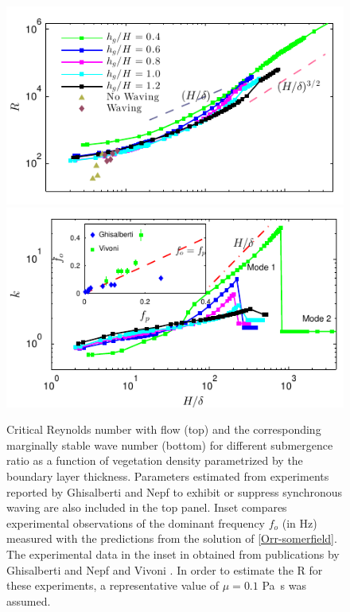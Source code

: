 \documentclass[aps,prl,twocolumn,superscriptaddress,10pt]{revtex4-1}  %
\newcommand{\Rey}{\text{R}}
\begin{document}
\begin{figure}
\begin{center}
\includegraphics[]{Critical_Re_vs_delta_noshear} \\
\vspace{-6mm} \hspace{-3mm}
\includegraphics[]{K_vs_shear_width_noshear}
\end{center}
\caption{Critical Reynolds number with flow (top) and the corresponding marginally stable wave number (bottom) for different submergence ratio as a function of vegetation density
 parametrized by the boundary layer thickness. Parameters estimated from experiments reported by Ghisalberti and Nepf\cite{Ghisal02} to exhibit or suppress synchronous waving are 
also included in the top panel. Inset compares experimental observations 
of the dominant frequency $f_o$ (in Hz) measured with the predictions from the solution of \eqref{Orr-somerfield}. The experimental data in the inset in obtained from publications by 
Ghisalberti and Nepf \cite{Ghisal02} and Vivoni \cite{Vivoni98}. In order to estimate the $\Rey$ for these experiments, a representative value of $\mu=0.1$ Pa~s was assumed.}
\label{Re_vs_delta}
\end{figure}
\end{document}
